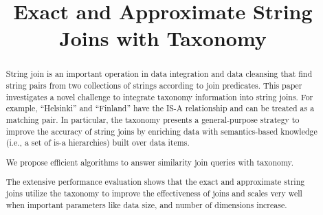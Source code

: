 \documentclass{sig-alternate}
\newcommand{\topkm}{\mbox{top-$k$,$m$}}
\begin{document}


\title{Exact and Approximate String Joins with Taxonomy}


\author{
}




\maketitle

\begin{abstract}

String join is an important operation in  data integration
and data cleansing that find string pairs from
two collections of strings according to join predicates. This paper investigates a novel challenge to integrate taxonomy information into string joins. For example, ``Helsinki'' and ``Finland'' have the IS-A relationship and can be treated as a matching pair.  In particular, the taxonomy presents a general-purpose strategy to improve the accuracy of string joins by enriching data with semantics-based knowledge  (i.e., a set of is-a hierarchies) built over data items.


We propose efficient algorithms to answer similarity join queries with taxonomy.

The extensive performance evaluation shows that the exact and approximate string joins utilize the taxonomy to improve the effectiveness of joins  and scales very well when important parameters like  data size, and number of dimensions increase.


\end{abstract}
\end{document}

